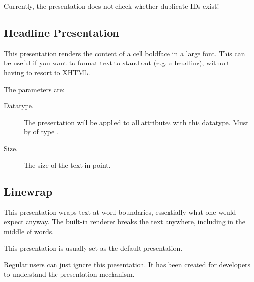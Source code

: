 \begin{warning}
Currently, the presentation does not check whether duplicate IDs exist!
\end{warning}

\subsection{Headline Presentation}

This presentation renders the content of a cell boldface in a large font.  This can be useful if
you want to format text to stand out (e.g. a headline), without having to resort to XHTML.

The parameters are:

\begin{description}
\item[Datatype.] The presentation will be applied to all attributes with this datatype.  Must by of type .
\item[Size.] The size of the text in point.
\end{description}

\subsection{Linewrap}

This presentation wraps text at word boundaries, essentially what one would expect anyway.  The built-in renderer breaks the text anywhere, including in the middle of words.

This presentation is usually set as the default presentation.

\begin{info}
Regular users can just ignore this presentation.  It has been created for developers to understand the presentation mechanism.
\end{info}

